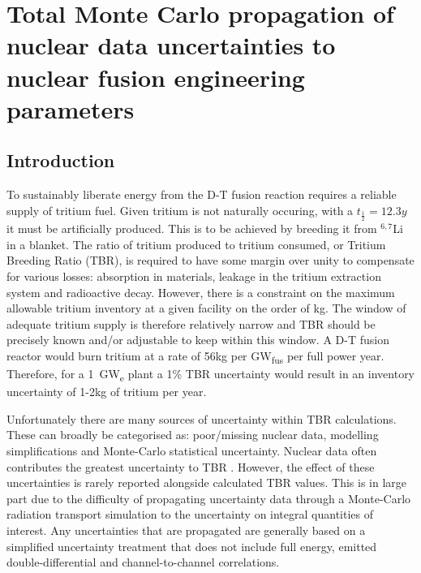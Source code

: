 
\chapter{Total Monte Carlo propagation of nuclear data uncertainties to nuclear fusion engineering parameters} %

\ifpdf
    \graphicspath{{Chapter1/Figs/Raster/}{Chapter1/Figs/PDF/}{Chapter1/Figs/}}
\else
    \graphicspath{{Chapter1/Figs/Vector/}{Chapter1/Figs/}}
\fi

\nomenclature[g-pi]{$\pi$}{ $\simeq 3.14\ldots$}

\section{Introduction}




\label{introduction}
To sustainably liberate energy from the D-T fusion reaction requires a reliable supply of tritium fuel. Given tritium is not naturally occuring, with a $t_{\frac{1}{2}}=12.3y$ it must be artificially produced. This is to be achieved by breeding it from $^{6,7}$Li in a blanket. The ratio of tritium produced to tritium consumed, or Tritium Breeding Ratio (TBR), is required to have some margin over unity to compensate for various losses: absorption in materials, leakage in the tritium extraction system and radioactive decay. However, there is a constraint on the maximum allowable tritium inventory at a given facility on the order of kg. The window of adequate tritium supply is therefore relatively narrow and TBR should be precisely known and/or adjustable to keep within this window. A D-T fusion reactor would burn tritium at a rate of 56kg per GW\textsubscript{fus} per full power year. Therefore, for a 1~GW\textsubscript{e} plant a 1\% TBR uncertainty would result in an inventory uncertainty of 1-2kg of tritium per year.

Unfortunately there are many sources of uncertainty within TBR calculations. These can broadly be categorised as: poor/missing nuclear data, modelling simplifications and Monte-Carlo statistical uncertainty. Nuclear data often contributes the greatest uncertainty to TBR \cite{El-Guebaly2009}. However, the effect of these uncertainties is rarely reported alongside calculated TBR values. This is in large part due to the difficulty of propagating uncertainty data through a Monte-Carlo radiation transport simulation to the uncertainty on integral quantities of interest. Any uncertainties that are propagated are generally based on a simplified uncertainty treatment that does not include full energy, emitted double-differential and channel-to-channel correlations. 


